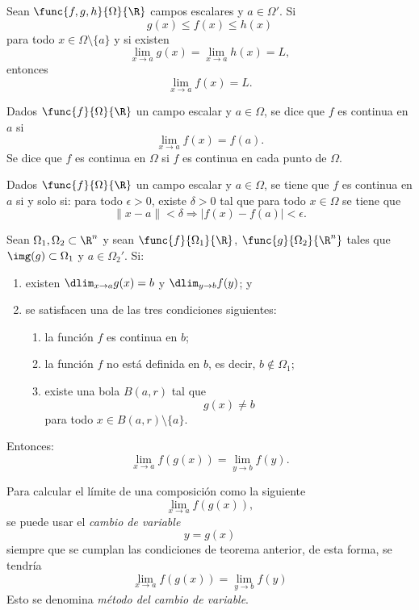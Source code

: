 \documentclass[a4,11pt]{aleph-notas}
\begin{document}
\begin{prop}
    Sean $\func{f,g,h}{\Omega}{\R}$ campos escalares y $a\in \Omega'$. Si
    \[
    	g(x)\leq f(x) \leq h(x)
    \]
    para todo $x\in \Omega\setminus\{a\}$ y si existen
    \[
        \lim_{x\to a}g(x)=\lim_{x\to a}h(x)=L,
    \]
    entonces
    \[
    	\lim_{x\to a}f(x)=L.
    \]
\end{prop}

\begin{defi}[Continuidad]
    Dados $\func{f}{\Omega}{\R}$ un campo escalar y $a\in \Omega$, se dice que $f$ es continua en $a$ si
    \[
        \lim_{x\to a}f(x)=f(a).
    \]
    Se dice que $f$ es continua en $\Omega$ si $f$ es continua en cada punto de $\Omega$.
\end{defi}

\begin{prop}
    Dados $\func{f}{\Omega}{\R}$ un campo escalar y $a\in \Omega$, se tiene que $f$ es continua en $a$ si y solo si: para todo $\epsilon>0$, existe $\delta>0$ tal que para todo $x\in \Omega$ se tiene que
    \[
        \|x-a\|<\delta \Longrightarrow |f(x)-f(a)|<\epsilon.
    \]
\end{prop}

\begin{teo}
    Sean $\Omega_1,\Omega_2\subset \R^n$ y sean $\func{f}{\Omega_1}{\R}$, $\func{g}{\Omega_2}{\R^n}$ tales que $\img(g)\subset \Omega_1$ y $a\in\Omega_2'$. Si:
    \begin{enumerate}
    \item existen $\dlim_{x\to a}g(x)=b$ y $\dlim_{y\to b}f(y)$; y
    \item se satisfacen una de las tres condiciones siguientes:
        \begin{enumerate}
        \item la función $f$ es continua en $b$;
        \item la función $f$ no está definida en $b$, es decir, $b\not\in \Omega_1$;
        \item existe una bola $B(a,r)$ tal que
        \[
            g(x) \neq b
        \]
        para todo $x\in B(a,r)\setminus\{a\}$.
        \end{enumerate}
    \end{enumerate}
    Entonces:
    \[
        \lim_{x\to a}f(g(x)) = \lim_{y\to b}f(y).
    \]
\end{teo}

\begin{advertencia}
    Para calcular el límite de una composición como la siguiente
    \[
        \lim_{x\to a}f(g(x)),
    \]
    se puede usar el \emph{cambio de variable}
    \[
        y = g(x)
    \]
    siempre que se cumplan las condiciones de teorema anterior, de esta forma, se tendría
    \[
        \lim_{x\to a}f(g(x)) = \lim_{y\to b} f(y)
    \]
    Esto se denomina \emph{método del cambio de variable}.
\end{advertencia}
\end{document}
